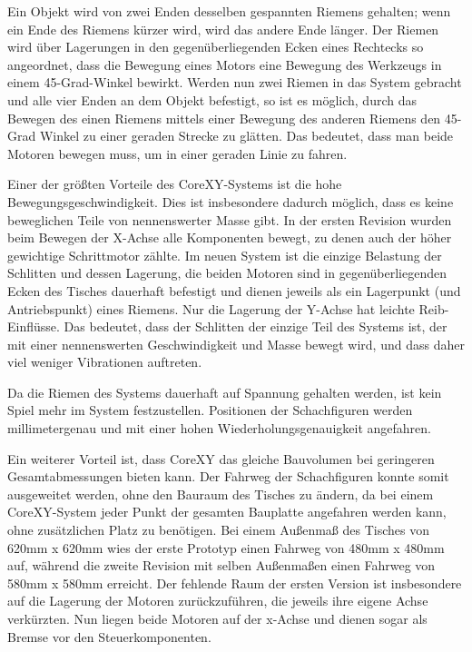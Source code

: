Ein Objekt wird von zwei Enden desselben gespannten Riemens gehalten;
wenn ein Ende des Riemens kürzer wird, wird das andere Ende länger. Der
Riemen wird über Lagerungen in den gegenüberliegenden Ecken eines
Rechtecks so angeordnet, dass die Bewegung eines Motors eine Bewegung
des Werkzeugs in einem 45-Grad-Winkel bewirkt. Werden nun zwei Riemen in
das System gebracht und alle vier Enden an dem Objekt befestigt, so ist
es möglich, durch das Bewegen des einen Riemens mittels einer Bewegung
des anderen Riemens den 45-Grad Winkel zu einer geraden Strecke zu
glätten. Das bedeutet, dass man beide Motoren bewegen muss, um in einer
geraden Linie zu fahren.

Einer der größten Vorteile des CoreXY-Systems ist die hohe
Bewegungsgeschwindigkeit. Dies ist insbesondere dadurch möglich, dass es
keine beweglichen Teile von nennenswerter Masse gibt. In der ersten
Revision wurden beim Bewegen der X-Achse alle Komponenten bewegt, zu
denen auch der höher gewichtige Schrittmotor zählte. Im neuen System ist
die einzige Belastung der Schlitten und dessen Lagerung, die beiden
Motoren sind in gegenüberliegenden Ecken des Tisches dauerhaft befestigt
und dienen jeweils als ein Lagerpunkt (und Antriebspunkt) eines Riemens.
Nur die Lagerung der Y-Achse hat leichte Reib-Einflüsse. Das bedeutet,
dass der Schlitten der einzige Teil des Systems ist, der mit einer
nennenswerten Geschwindigkeit und Masse bewegt wird, und dass daher viel
weniger Vibrationen auftreten.

Da die Riemen des Systems dauerhaft auf Spannung gehalten werden, ist
kein Spiel mehr im System festzustellen. Positionen der Schachfiguren
werden millimetergenau und mit einer hohen Wiederholungsgenauigkeit
angefahren.

Ein weiterer Vorteil ist, dass CoreXY das gleiche Bauvolumen bei
geringeren Gesamtabmessungen bieten kann. Der Fahrweg der Schachfiguren
konnte somit ausgeweitet werden, ohne den Bauraum des Tisches zu ändern,
da bei einem CoreXY-System jeder Punkt der gesamten Bauplatte angefahren
werden kann, ohne zusätzlichen Platz zu benötigen. Bei einem Außenmaß
des Tisches von 620mm x 620mm wies der erste Prototyp einen Fahrweg von
480mm x 480mm auf, während die zweite Revision mit selben Außenmaßen
einen Fahrweg von 580mm x 580mm erreicht. Der fehlende Raum der ersten
Version ist insbesondere auf die Lagerung der Motoren zurückzuführen,
die jeweils ihre eigene Achse verkürzten. Nun liegen beide Motoren auf
der x-Achse und dienen sogar als Bremse vor den Steuerkomponenten.

